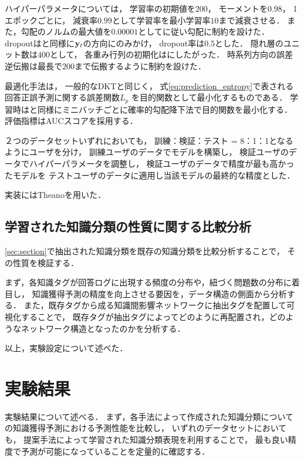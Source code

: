 ハイパーパラメータについては，
学習率の初期値を$200$，
モーメントを$0.98$，
1エポックごとに，
減衰率$0.99$として学習率を最小学習率$10$まで減衰させる．
また，勾配のノルムの最大値を$0.00001$として\cite{pascanu2013difficulty}に従い勾配に制約を設けた．
dropoutは\cite{piech2015deep}と同様に${\bf y}_t$の方向にのみかけ，
dropout率は$0.5$とした．
隠れ層のユニット数は$400$として，
各重み行列の初期化は\cite{glorot2010understanding}にしたがった．
時系列方向の誤差逆伝搬は最長で$200$まで伝搬するように制約を設けた．

最適化手法は，
一般的なDKTと同じく，
式\ref{eq:prediction_entropy}で表される回答正誤予測に関する誤差関数$L_p$
を目的関数として最小化するものである．
学習時は\cite{piech2015deep}と同様にミニバッチごとに確率的勾配降下法で目的関数を最小化する．
評価指標はAUCスコアを採用する．

２つのデータセットいずれにおいても，
訓練：検証：テスト = 8：1：1となるようにユーザを分け，
訓練ユーザのデータでモデルを構築し，
検証ユーザのデータでハイパーパラメータを調整し， 
検証ユーザのデータで精度が最も高かったモデルを
テストユーザのデータに適用し当該モデルの最終的な精度とした．

実装にはTheanoを用いた．


\subsection{学習された知識分類の性質に関する比較分析}

\ref{sec:section}で抽出された知識分類を既存の知識分類を比較分析することで，
その性質を検証する．

まず，各知識タグが回答ログに出現する頻度の分布や，紐づく問題数の分布に着目し，
知識獲得予測の精度を向上させる要因を，データ構造の側面から分析する．
また，既存タグから成る知識間影響ネットワークに抽出タグを配置して可視化することで，
既存タグが抽出タグによってどのように再配置され，どのようなネットワーク構造となったのかを分析する．




以上，実験設定について述べた．



\section{実験結果}
実験結果について述べる．
まず，各手法によって作成された知識分類についての知識獲得予測における予測性能を比較し，
いずれのデータセットにおいても，
提案手法によって学習された知識分類表現を利用することで，
最も良い精度で予測が可能になっていることを定量的に確認する．

